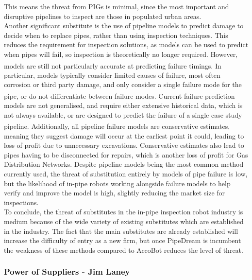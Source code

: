 \documentclass[11pt]{article}		%
\newcommand{\supercite}[1]{\textsuperscript{\cite{#1}}}		%
\begin{document}
				This means the threat from PIGs is minimal, since the most important and disruptive pipelines to inspect are those in populated urban areas.
				\\
                \hspace*{2ex}Another significant substitute is the use of pipeline models to predict damage to decide when to replace pipes, rather than using inspection techniques.
				This reduces the requirement for inspection solutions, as models can be used to predict when pipes will fail, so inspection is theoretically no longer required.
				However, models are still not particularly accurate at predicting failure timings\supercite{zakikhani2020review}.
				In particular, models typically consider limited causes of failure, most often corrosion or third party damage, and only consider a single failure mode for the pipe, or  do not differentiate between failure modes\supercite{zakikhani2020review}.
				Current failure prediction models are not generalised, and require either extensive historical data, which is not always available, or are designed to predict the failure of a single case study pipeline\supercite{zakikhani2020review}.
				Additionally, all pipeline failure models are conservative estimates, meaning they suggest damage will occur at the earliest point it could, leading to loss of profit due to unnecessary excavations.
				Conservative estimates also lead to pipes having to be disconnected for repairs, which is another loss of profit for Gas Distribution Networks.
				Despite pipeline models being the most common method currently used, the threat of substitution entirely by models of pipe failure is low, but the likelihood of in-pipe robots working alongside failure models to help verify and improve the model is high, slightly reducing the market size for inspections. 
				\\
                \hspace*{2ex}To conclude, the threat of substitutes in the in-pipe inspection robot industry is medium because of the wide variety of existing substitutes which are established in the industry.
				The fact that the main substitutes are already established will increase the difficulty of entry as a new firm, but once PipeDream is incumbent the weakness of these methods compared to AccoBot reduces the level of threat.
				
			\subsubsection{Power of Suppliers - Jim Laney}
				
\end{document}
